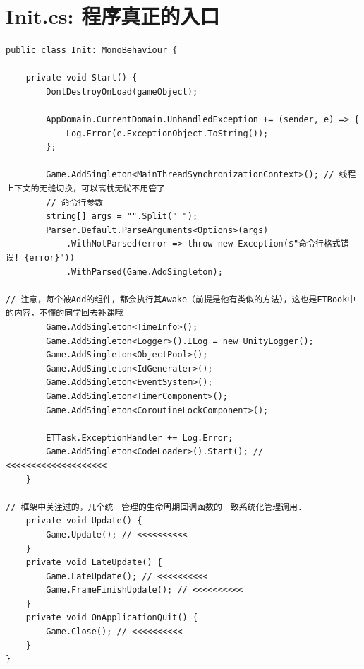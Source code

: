 \documentclass[9pt, b5paper]{article}
\begin{document}
\section{Init.cs: 程序真正的入口}
\label{sec-7}
\begin{verbatim}
public class Init: MonoBehaviour {

    private void Start() {
        DontDestroyOnLoad(gameObject);
            
        AppDomain.CurrentDomain.UnhandledException += (sender, e) => {
            Log.Error(e.ExceptionObject.ToString());
        };
                
        Game.AddSingleton<MainThreadSynchronizationContext>(); // 线程上下文的无缝切换，可以高枕无忧不用管了
        // 命令行参数
        string[] args = "".Split(" ");
        Parser.Default.ParseArguments<Options>(args)
            .WithNotParsed(error => throw new Exception($"命令行格式错误! {error}"))
            .WithParsed(Game.AddSingleton);

// 注意，每个被Add的组件，都会执行其Awake（前提是他有类似的方法），这也是ETBook中的内容，不懂的同学回去补课哦
        Game.AddSingleton<TimeInfo>();
        Game.AddSingleton<Logger>().ILog = new UnityLogger();
        Game.AddSingleton<ObjectPool>();
        Game.AddSingleton<IdGenerater>();
        Game.AddSingleton<EventSystem>();
        Game.AddSingleton<TimerComponent>();
        Game.AddSingleton<CoroutineLockComponent>();
            
        ETTask.ExceptionHandler += Log.Error;
        Game.AddSingleton<CodeLoader>().Start(); // <<<<<<<<<<<<<<<<<<<< 
    }
        
// 框架中关注过的，几个统一管理的生命周期回调函数的一致系统化管理调用. 
    private void Update() {
        Game.Update(); // <<<<<<<<<< 
    }
    private void LateUpdate() {
        Game.LateUpdate(); // <<<<<<<<<< 
        Game.FrameFinishUpdate(); // <<<<<<<<<< 
    }
    private void OnApplicationQuit() {
        Game.Close(); // <<<<<<<<<< 
    }
}
\end{verbatim}
\end{document}
